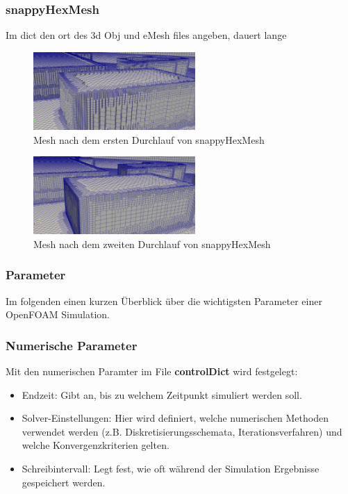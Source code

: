 \subsubsection{snappyHexMesh\label{openfoam:section:snappyHexMesh}}
Im dict den ort des 3d Obj und eMesh files angeben, dauert lange

\begin{figure}
    \centering
    \includegraphics[width=0.55\textwidth]{papers/openfoam/Bilder/Snappy_grob.png}
    \caption{Mesh nach dem ersten Durchlauf von snappyHexMesh}
    \label{fig:snappygrobbild}
\end{figure}

\begin{figure}
    \centering
    \includegraphics[width=0.55\textwidth]{papers/openfoam/Bilder/Snappy_fein.png}
    \caption{Mesh nach dem zweiten Durchlauf von snappyHexMesh}
    \label{fig:snappyfeinbild}
\end{figure}
\subsubsection{Parameter\label{openfoam:section:Parameter}}
Im folgenden einen kurzen Überblick über die wichtigsten Parameter einer OpenFOAM Simulation.

\subsubsection{Numerische Parameter\label{openfoam:section:Numerische Parameter}}
Mit den numerischen Paramter im File \textbf{controlDict} wird festgelegt:
\begin{itemize}
    \item Endzeit: Gibt an, bis zu welchem Zeitpunkt simuliert werden soll.
    \item Solver-Einstellungen: Hier wird definiert, welche numerischen Methoden verwendet werden (z.B. Diskretisierungsschemata, Iterationsverfahren) und welche Konvergenzkriterien gelten.
    \item Schreibintervall: Legt fest, wie oft während der Simulation Ergebnisse gespeichert werden.
\end{itemize}

